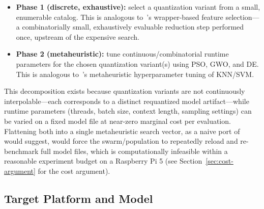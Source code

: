 \documentclass[journal]{IEEEtran}
\begin{document}
\begin{itemize}
  \item \textbf{Phase 1 (discrete, exhaustive):} select a quantization variant from a small, enumerable catalog. This is analogous to~\cite{ref11}'s wrapper-based feature selection---a combinatorially small, exhaustively evaluable reduction step performed once, upstream of the expensive search.
  \item \textbf{Phase 2 (metaheuristic):} tune continuous/combinatorial runtime parameters for the chosen quantization variant(s) using PSO, GWO, and DE. This is analogous to~\cite{ref11}'s metaheuristic hyperparameter tuning of KNN/SVM.
\end{itemize}

This decomposition exists because quantization variants are not continuously interpolable---each corresponds to a distinct requantized model artifact---while runtime parameters (threads, batch size, context length, sampling settings) can be varied on a fixed model file at near-zero marginal cost per evaluation. Flattening both into a single metaheuristic search vector, as a naive port of~\cite{ref11} would suggest, would force the swarm/population to repeatedly reload and re-benchmark full model files, which is computationally infeasible within a reasonable experiment budget on a Raspberry Pi 5 (see Section~\ref{sec:cost-argument} for the cost argument).

\subsection{Target Platform and Model}
\end{document}
